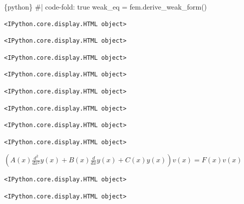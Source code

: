 \documentclass[
  11pt,
  a4paper,
]{scrbook}
\newenvironment{Shaded}{\begin{snugshade}}{\end{snugshade}}
\newcommand{\InformationTok}[1]{\textcolor[rgb]{0.37,0.37,0.37}{#1}}
\begin{document}
\begin{Shaded}
\begin{Highlighting}[]
\InformationTok{\textasciigrave{}\textasciigrave{}\textasciigrave{}\{python\}}
\InformationTok{\#| code{-}fold: true}
\InformationTok{weak\_eq = fem.derive\_weak\_form()}
\InformationTok{\textasciigrave{}\textasciigrave{}\textasciigrave{}}
\end{Highlighting}
\end{Shaded}

\begin{verbatim}
<IPython.core.display.HTML object>
\end{verbatim}

\begin{verbatim}
<IPython.core.display.HTML object>
\end{verbatim}

\begin{verbatim}
<IPython.core.display.HTML object>
\end{verbatim}

\begin{verbatim}
<IPython.core.display.HTML object>
\end{verbatim}

\begin{verbatim}
<IPython.core.display.HTML object>
\end{verbatim}

\begin{verbatim}
<IPython.core.display.HTML object>
\end{verbatim}

\begin{verbatim}
<IPython.core.display.HTML object>
\end{verbatim}

\begin{verbatim}
<IPython.core.display.HTML object>
\end{verbatim}

$\displaystyle \left(A{\left(x \right)} \frac{d^{2}}{d x^{2}} y{\left(x \right)} + B{\left(x \right)} \frac{d}{d x} y{\left(x \right)} + C{\left(x \right)} y{\left(x \right)}\right) v{\left(x \right)} = F{\left(x \right)} v{\left(x \right)}$

\begin{verbatim}
<IPython.core.display.HTML object>
\end{verbatim}

\begin{verbatim}
<IPython.core.display.HTML object>
\end{verbatim}
\end{document}
